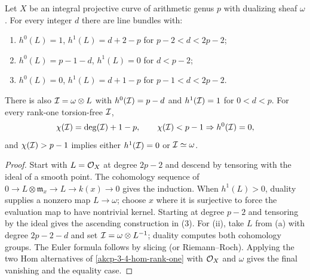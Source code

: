 \begin{proposition}
\label{akcp-3-5-curve-sheaves}
Let $X$ be an integral projective curve of arithmetic genus $p$ with dualizing
sheaf $\omega$.  For every integer $d$ there are line bundles with:
\begin{enumerate}
\item $h^0(L)=1$, $h^1(L)=d+2-p$ for $p-2<d<2p-2$;
\item $h^0(L)=p-1-d$, $h^1(L)=0$ for $d<p-2$;
\item $h^0(L)=0$, $h^1(L)=d+1-p$ for $p-1<d<2p-2$.
\end{enumerate}
There is also $\mathcal I=\omega\otimes L$ with $h^0(\mathcal I)=p-d$ and
$h^1(\mathcal I)=1$ for $0<d<p$.  For every rank-one torsion-free $\mathcal I$,
\[
\chi(\mathcal I)=\deg(\mathcal I)+1-p,\qquad
\chi(\mathcal I)<p-1\Rightarrow h^0(\mathcal I)=0,
\]
and $\chi(\mathcal I)>p-1$ implies either $h^1(\mathcal I)=0$ or $\mathcal I\simeq\omega$.
\end{proposition}
\begin{proof}
Start with $L=\mathcal O_X$ at degree $2p-2$ and descend by tensoring with the
ideal of a smooth point.  The cohomology sequence of
$0\to L\otimes\mathfrak m_x\to L\to k(x)\to0$ gives the induction.  When
$h^1(L)>0$, duality supplies a nonzero map $L\to\omega$; choose $x$ where it
is surjective to force the evaluation map to have nontrivial kernel.  Starting
at degree $p-2$ and tensoring by the ideal gives the ascending construction in
(3).  For (ii), take $L$ from (a) with degree $2p-2-d$ and set
$\mathcal I=\omega\otimes L^{-1}$; duality computes both cohomology groups.
The Euler formula follows by slicing (or Riemann--Roch).  Applying the two
Hom alternatives of \cref{akcp-3-4-hom-rank-one} with $\mathcal O_X$ and $\omega$
gives the final vanishing and the equality case.
\end{proof}
